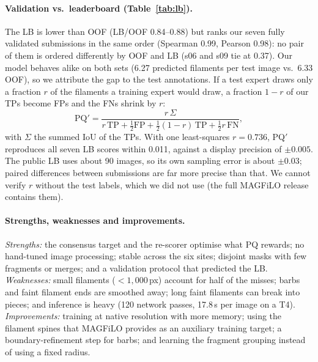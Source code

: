 \documentclass[sigconf]{acmart}
\begin{document}
\paragraph{Validation vs.\ leaderboard (Table~\ref{tab:lb}).} The LB is lower than OOF (LB/OOF 0.84--0.88) but ranks our
seven fully validated submissions in the same order (Spearman 0.99, Pearson 0.98): no pair of them is ordered
differently by OOF and LB (s06 and s09 tie at 0.37). Our model behaves alike on both sets (6.27 predicted filaments per test
image vs.\ 6.33 OOF), so we attribute the gap to the test annotations. If a test expert draws only a fraction $r$ of the
filaments a training expert would draw, a fraction $1-r$ of our TPs become FPs and the FNs shrink by $r$:
\begin{equation}
  \mathrm{PQ}'=\frac{r\,\Sigma}{r\,\mathrm{TP}+\frac12\mathrm{FP}+\frac12(1-r)\,\mathrm{TP}+\frac12 r\,\mathrm{FN}},
  \label{eq:pqprime}
\end{equation}
with $\Sigma$ the summed IoU of the TPs. With one least-squares $r=0.736$, PQ$'$ reproduces all seven LB scores within 0.011,
against a display precision of $\pm0.005$. The public LB uses about 90 images, so its own sampling error is about
$\pm0.03$; paired differences between submissions are far more precise than that. We cannot verify $r$ without the
test labels, which we did not use (the full MAGFiLO release contains them).

\paragraph{Strengths, weaknesses and improvements.} \emph{Strengths:} the consensus target and the re-scorer optimise what
PQ rewards; no hand-tuned image processing; stable across the six sites; disjoint masks with few fragments or merges; and
a validation protocol that predicted the LB. \emph{Weaknesses:} small filaments ($<1{,}000$\,px) account for half of the
misses; barbs and faint filament ends are smoothed away; long faint filaments can break into pieces; and inference is
heavy (120 network passes, 17.8\,s per image on a T4). \emph{Improvements:} training at native resolution with more
memory; using the filament spines that MAGFiLO provides as an auxiliary training target; a boundary-refinement step
for barbs; and learning the fragment grouping instead of using a fixed radius.
\end{document}

